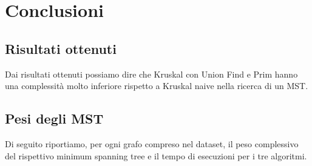\chapter{Conclusioni\label{sec:conclusioni}}

\section{Risultati ottenuti\label{sec:risultati-ottenuti}}
Dai risultati ottenuti possiamo dire che Kruskal con Union Find e Prim hanno una complessità molto inferiore rispetto a Kruskal naive nella ricerca di un MST.

\section{Pesi degli MST\label{sec:pesi-mst}}
Di seguito riportiamo, per ogni grafo compreso nel dataset, il peso complessivo del rispettivo minimum spanning tree e il tempo di esecuzioni per i tre algoritmi.

    